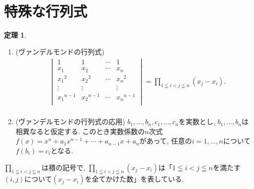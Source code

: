 \documentclass[dvipdfmx,a4paper,11pt]{article}
\theoremstyle{definition}
\newtheorem{thm}{定理}
\begin{document}
\section{特殊な行列式}
\begin{tcolorbox}[
    colback = white,
    colframe = green!35!black,
    fonttitle = \bfseries,
    breakable = true]
    \begin{thm}
  \begin{enumerate}
\item (ヴァンデルモンドの行列式)
\begin{align*}
 &
 \begin{vmatrix}
1   &   1     & \cdots &  1  \\
x_1& x_2 & \cdots &x_n \\
{x_1}^{2}& {x_2}^{2} & \cdots &{x_n}^{2} \\
\vdots & \vdots    &  &\vdots \\
{x_1}^{n-1}& {x_2}^{n-1} & \cdots &{x_n}^{n-1} \\
\end{vmatrix}
= \prod_{1 \leqq i < j \leqq n} (x_j - x_i).
\\%
\end{align*}
\item (ヴァンデルモンドの行列式の応用) $b_1, \ldots, b_n, c_1, \ldots, c_n$を実数とし, $b_1, \ldots, b_n$は相異なると仮定する.
 このとき実数係数の$n$次式$f(x) = x^{n} +  a_1 x^{n-1} +  \cdots +  a_{n-1} x + a_{n}$があって, 任意の$i = 1, \ldots, n$について$f(b_i) =c_i $となる.

  \end{enumerate}
    \end{thm}
 \end{tcolorbox}
$\prod_{1 \leqq i < j \leqq n}$は積の記号で, $\prod_{1 \leqq i < j \leqq n} (x_j - x_i)$は「$1 \leqq i < j \leqq n$を満たす$(i,j)$について$ (x_j - x_i)$を全てかけた数」を表している.
\end{document}
